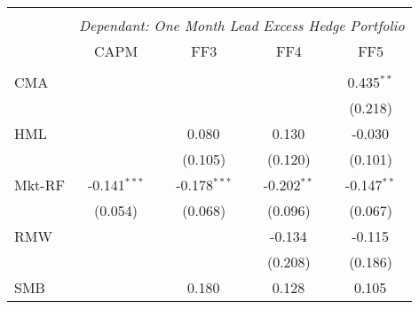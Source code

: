 \begin{table}[H] \centering
  \begin{tabular}{@{\extracolsep{5pt}}lcccc}
    \\[-1.8ex]\hline
    \hline                                                                                                                                                         \\[-1.8ex]
                        & \multicolumn{4}{c}{\textit{Dependant: One Month Lead Excess Hedge Portfolio}} \
    \cr \cline{2-5}
    \\[-1.8ex] & CAPM & FF3 & FF4 & FF5 \\
    \hline                                                                                                                                                         \\[-1.8ex]
    CMA                 &                                                                                  &                   &                   & 0.435$^{**}$  \\
                        &                                                                                  &                   &                   & (0.218)       \\
    HML                 &                                                                                  & 0.080$^{}$        & 0.130$^{}$        & -0.030$^{}$   \\
                        &                                                                                  & (0.105)           & (0.120)           & (0.101)       \\
    Mkt-RF              & -0.141$^{***}$                                                                   & -0.178$^{***}$    & -0.202$^{**}$     & -0.147$^{**}$ \\
                        & (0.054)                                                                          & (0.068)           & (0.096)           & (0.067)       \\
    RMW                 &                                                                                  &                   & -0.134$^{}$       & -0.115$^{}$   \\
                        &                                                                                  &                   & (0.208)           & (0.186)       \\
    SMB                 &                                                                                  & 0.180$^{}$        & 0.128$^{}$        & 0.105$^{}$    \\

\end{tabular}
\end{table}
